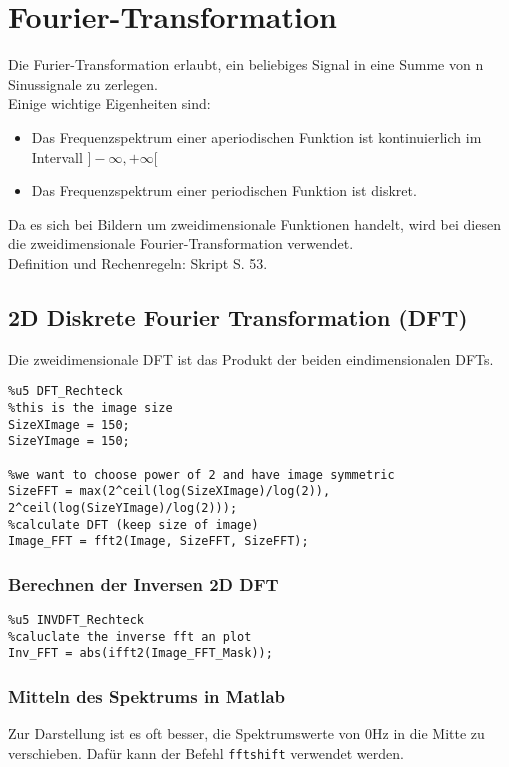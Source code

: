 \section{Fourier-Transformation}
Die Furier-Transformation erlaubt, ein beliebiges Signal in eine Summe von n Sinussignale zu zerlegen.\\
Einige wichtige Eigenheiten sind:
\begin{itemize}
    \item Das Frequenzspektrum einer aperiodischen Funktion ist kontinuierlich im Intervall $]-\infty , +\infty [$
    \item Das Frequenzspektrum einer periodischen Funktion ist diskret.
\end{itemize}
Da es sich bei Bildern um zweidimensionale Funktionen handelt, wird bei diesen die zweidimensionale Fourier-Transformation verwendet.\\
Definition und Rechenregeln: Skript S. 53.
\subsection{2D Diskrete Fourier Transformation (DFT)}
Die zweidimensionale DFT ist das Produkt der beiden eindimensionalen DFTs.
\begin{lstlisting}
%u5 DFT_Rechteck
%this is the image size
SizeXImage = 150;
SizeYImage = 150;

%we want to choose power of 2 and have image symmetric
SizeFFT = max(2^ceil(log(SizeXImage)/log(2)), 2^ceil(log(SizeYImage)/log(2)));
%calculate DFT (keep size of image)
Image_FFT = fft2(Image, SizeFFT, SizeFFT);
\end{lstlisting}

\subsubsection{Berechnen der Inversen 2D DFT}
\begin{lstlisting}
%u5 INVDFT_Rechteck
%caluclate the inverse fft an plot
Inv_FFT = abs(ifft2(Image_FFT_Mask));
\end{lstlisting}

\subsubsection{Mitteln des Spektrums in Matlab}
Zur Darstellung ist es oft besser, die Spektrumswerte von 0Hz in die Mitte zu verschieben. Dafür kann der Befehl \lstinline|fftshift| verwendet werden.


